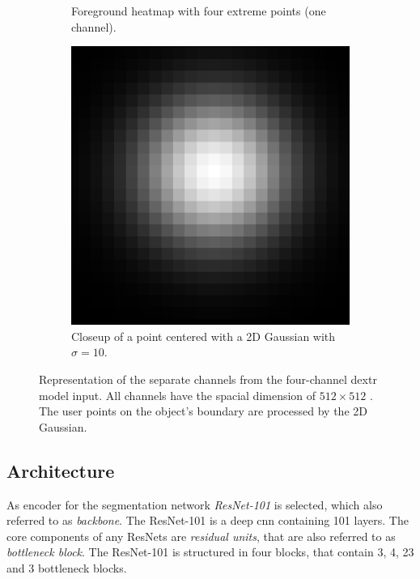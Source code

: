 \begin{figure}
\begin{subfigure}[b]{0.3\textwidth}
		\caption{Foreground heatmap with four extreme points (one channel).}
		\label{fig:ch3:sec3:fg_channel}
	\end{subfigure}
	\hfill
	\begin{subfigure}[b]{0.3\textwidth}
		\centering
		\includegraphics[width=\textwidth]{figures/chap33_gaussian_point.png}
		\caption{Closeup of a point centered with a 2D Gaussian with $\sigma = 10$.}
		\label{fig:ch3:sec3:gauss_centered_point}
	\end{subfigure}
	\caption[Four-channel DEXTR model input]{
		Representation of the separate channels from the four-channel \gls{dextr} model input.
		All channels have the spacial dimension of $512 \times 512$ .
		The user points on the object's boundary are processed by the 2D Gaussian.
	} \label{fig:ch3:sec3:model_input_channels}
\end{figure}


\subsection{Architecture}\label{ord:ch3:sec3:subsec3}

As encoder for the segmentation network \textit{ResNet-101} \cite{He16-ResNet} is selected, which also referred to as \textit{backbone}.
The ResNet-101 is a deep \gls{cnn} containing 101 layers.
The core components of any ResNets are \textit{residual units}, that are also referred to as \textit{bottleneck block}.
The ResNet-101 is structured in four blocks, that contain 3, 4, 23 and 3 bottleneck blocks.


